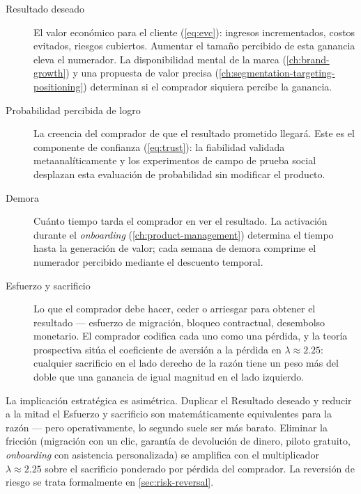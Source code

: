 \begin{description}
  \item[Resultado deseado] El valor económico para el cliente (\cref{eq:evc}): ingresos incrementados, costos evitados, riesgos cubiertos. Aumentar el tamaño percibido de esta ganancia eleva el numerador. La disponibilidad mental de la marca (\cref{ch:brand-growth}) y una propuesta de valor precisa (\cref{ch:segmentation-targeting-positioning}) determinan si el comprador siquiera percibe la ganancia.
  \item[Probabilidad percibida de logro] La creencia del comprador de que el resultado prometido llegará. Este es el componente de confianza (\cref{eq:trust}): la fiabilidad validada metaanalíticamente \parencite{colquitt2007meta} y los experimentos de campo de prueba social \parencite{goldstein2008field} desplazan esta evaluación de probabilidad sin modificar el producto.
  \item[Demora] Cuánto tiempo tarda el comprador en ver el resultado. La activación durante el \emph{onboarding} (\cref{ch:product-management}) determina el tiempo hasta la generación de valor; cada semana de demora comprime el numerador percibido mediante el descuento temporal.
  \item[Esfuerzo y sacrificio] Lo que el comprador debe hacer, ceder o arriesgar para obtener el resultado --- esfuerzo de migración, bloqueo contractual, desembolso monetario. El comprador codifica cada uno como una pérdida, y la teoría prospectiva \parencite{tversky1992cumulative} sitúa el coeficiente de aversión a la pérdida en $\lambda \approx 2.25$: cualquier sacrificio en el lado derecho de la razón tiene un peso más del doble que una ganancia de igual magnitud en el lado izquierdo.
\end{description}

La implicación estratégica es asimétrica. Duplicar el Resultado deseado y reducir a la mitad el Esfuerzo y sacrificio son matemáticamente equivalentes para la razón --- pero operativamente, lo segundo suele ser más barato. Eliminar la fricción (migración con un clic, garantía de devolución de dinero, piloto gratuito, \emph{onboarding} con asistencia personalizada) se amplifica con el multiplicador $\lambda \approx 2.25$ sobre el sacrificio ponderado por pérdida del comprador. La reversión de riesgo se trata formalmente en \cref{sec:risk-reversal}.

